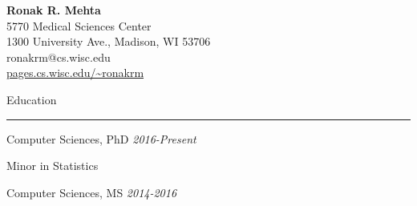 \documentclass[]{article}
\title{}
\author{}
\date{}
\begin{document}
\begin{center}
	{\Huge\bf Ronak R. Mehta} \\
	\vspace{5pt}
	{\large 5770 Medical Sciences Center \\
	1300 University Ave., Madison, WI 53706 \\
	ronakrm@cs.wisc.edu \\
	\url{pages.cs.wisc.edu/~ronakrm} }
\end{center}



\vspace{20pt}
{\LARGE Education}
\vspace{3pt}
\hrule
\vspace{10pt}


	{Computer Sciences, PhD \hfill \textit{2016-Present}}
	
	\qquad Minor in Statistics
		
	{Computer Sciences, MS \hfill \textit{2014-2016}}
	
\end{document}
